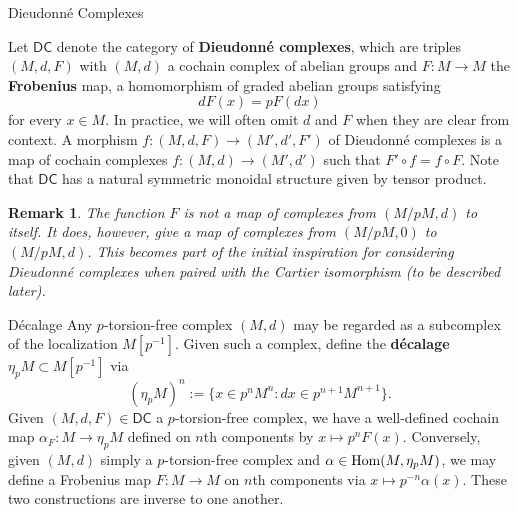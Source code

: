 \documentclass[aspectratio=1610]{beamer}
\newcommand{\DC}{\mathsf{DC}}
\newtheorem{remark}{Remark}
\begin{document}
\begin{frame}{Dieudonn\'{e} Complexes}
\begin{definition}
Let $\DC$ denote the category of \textbf{Dieudonn\'{e} complexes}, which are triples $(M,d,F)$ with $(M,d)$ a cochain complex of abelian groups and $F: M\to M$ the \textbf{Frobenius} map, a homomorphism of graded abelian groups satisfying 
$$dF(x)=pF(dx)$$
for every $x\in M$. In practice, we will often omit $d$ and $F$ when they are clear from context. A morphism $f: (M,d,F)\to(M',d',F')$ of Dieudonn\'{e} complexes is a map of cochain complexes $f: (M,d)\to(M',d')$ such that $F'\circ f=f\circ F$. Note that $\DC$ has a natural symmetric monoidal structure given by tensor product.
\end{definition}

\begin{remark}
The function $F$ is not a map of complexes from $(M/pM,d)$ to itself. It does, however, give a map of complexes from $(M/pM,0)$ to $(M/pM,d)$. This becomes part of the initial inspiration for considering Dieudonn\'{e} complexes when paired with the Cartier isomorphism (to be described later).
\end{remark}
\end{frame}

\begin{frame}{D\'{e}calage}
Any $p$-torsion-free complex $(M,d)$ may be regarded as a subcomplex of the localization $M[p^{-1}]$. Given such a complex, define the \textbf{d\'{e}calage} $\eta_pM\subset M[p^{-1}]$ via
$$(\eta_pM)^n:=\{x\in p^nM^n : dx\in p^{n+1}M^{n+1}\}.$$
Given $(M,d,F)\in\DC$ a $p$-torsion-free complex, we have a well-defined cochain map $\alpha_F: M\to\eta_pM$ defined on $n$th components by $x\mapsto p^nF(x)$. Conversely, given $(M,d)$ simply a $p$-torsion-free complex and $\alpha\in\operatorname{Hom}(M,\eta_pM)$, we may define a Frobenius map $F: M\to M$ on $n$th components via $x\mapsto p^{-n}\alpha(x)$. These two constructions are inverse to one another.
\end{frame}
\end{document}
